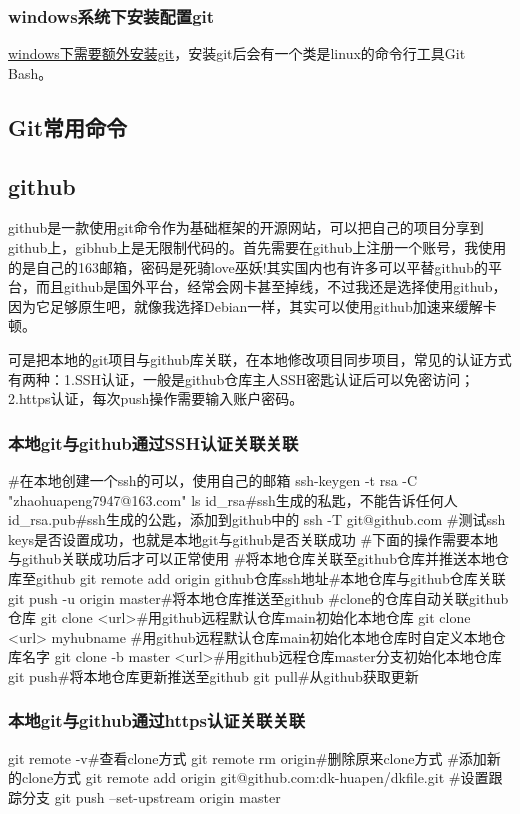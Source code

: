 \subsubsection{windows系统下安装配置git}
\href{https://blog.csdn.net/weixin_30824277/article/details/98382857?spm=1001.2014.3001.5506}{windows下需要额外安装git}，安装git后会有一个类是linux的命令行工具Git Bash。
\subsection{Git常用命令}
\subsection{github}
github是一款使用git命令作为基础框架的开源网站，可以把自己的项目分享到github上，gibhub上是无限制代码的。首先需要在github上注册一个账号，我使用的是自己的163邮箱，密码是死骑love巫妖!其实国内也有许多可以平替github的平台，而且github是国外平台，经常会网卡甚至掉线，不过我还是选择使用github，因为它足够原生吧，就像我选择Debian一样，其实可以使用github加速来缓解卡顿。

可是把本地的git项目与github库关联，在本地修改项目同步项目，常见的认证方式有两种：1.SSH认证，一般是github仓库主人SSH密匙认证后可以免密访问；2.https认证，每次push操作需要输入账户密码。
\subsubsection{本地git与github通过SSH认证关联关联}
\begin{shell}
#在本地创建一个ssh的可以，使用自己的邮箱
ssh-keygen -t rsa -C "zhaohuapeng7947@163.com"
ls
id_rsa#ssh生成的私匙，不能告诉任何人
id_rsa.pub#ssh生成的公匙，添加到github中的
ssh -T git@github.com
#测试ssh keys是否设置成功，也就是本地git与github是否关联成功
#下面的操作需要本地与github关联成功后才可以正常使用
#将本地仓库关联至github仓库并推送本地仓库至github
git remote add origin github仓库ssh地址#本地仓库与github仓库关联
git push -u origin master#将本地仓库推送至github
#clone的仓库自动关联github仓库
git clone <url>#用github远程默认仓库main初始化本地仓库
git clone <url> myhubname
#用github远程默认仓库main初始化本地仓库时自定义本地仓库名字
git clone -b master <url>#用github远程仓库master分支初始化本地仓库
git push#将本地仓库更新推送至github
git pull#从github获取更新
\end{shell}
\subsubsection{本地git与github通过https认证关联关联}
\begin{shell}
git remote -v#查看clone方式
git remote rm origin#删除原来clone方式
#添加新的clone方式
git remote add origin git@github.com:dk-huapen/dkfile.git
#设置跟踪分支
git push --set-upstream origin master
\end{shell}
